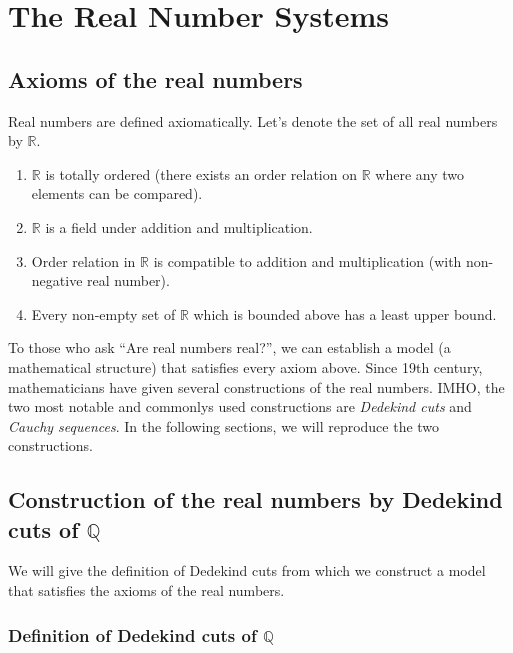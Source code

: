 \chapter{The Real Number Systems}

\section{Axioms of the real numbers}

Real numbers are defined axiomatically. Let's denote the set of all real numbers by $\mathbb{R}$.
\begin{enumerate}[label={(\roman*)}]
    \item $\mathbb{R}$ is totally ordered (there exists an order relation on $\mathbb{R}$ where any two elements can be compared).
    \item $\mathbb{R}$ is a field under addition and multiplication.
    \item Order relation in $\mathbb{R}$ is compatible to addition and multiplication (with non-negative real number).
    \item Every non-empty set of $\mathbb{R}$ which is bounded above has a least upper bound.
\end{enumerate}

To those who ask ``Are real numbers real?\@'', we can establish a model (a mathematical structure) that satisfies every axiom above. Since 19th century, mathematicians have given several constructions of the real numbers. IMHO, the two most notable and commonlys used constructions are \textit{Dedekind cuts} and \textit{Cauchy sequences}. In the following sections, we will reproduce the two constructions.

\section{Construction of the real numbers by Dedekind cuts of $\mathbb{Q}$}

We will give the definition of Dedekind cuts from which we construct a model that satisfies the axioms of the real numbers.

\subsection{Definition of Dedekind cuts of $\mathbb{Q}$}

